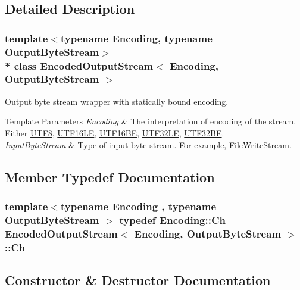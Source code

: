 \subsection{Detailed Description}
\subsubsection*{template$<$typename Encoding, typename Output\+Byte\+Stream$>$\\*
class Encoded\+Output\+Stream$<$ Encoding, Output\+Byte\+Stream $>$}

Output byte stream wrapper with statically bound encoding. 


\begin{DoxyTemplParams}{Template Parameters}
{\em Encoding} & The interpretation of encoding of the stream. Either \hyperlink{structUTF8}{U\+T\+F8}, \hyperlink{structUTF16LE}{U\+T\+F16\+LE}, \hyperlink{structUTF16BE}{U\+T\+F16\+BE}, \hyperlink{structUTF32LE}{U\+T\+F32\+LE}, \hyperlink{structUTF32BE}{U\+T\+F32\+BE}. \\
\hline
{\em Input\+Byte\+Stream} & Type of input byte stream. For example, \hyperlink{classFileWriteStream}{File\+Write\+Stream}. \\
\hline
\end{DoxyTemplParams}


\subsection{Member Typedef Documentation}
\subsubsection[{\texorpdfstring{Ch}{Ch}}]{\setlength{\rightskip}{0pt plus 5cm}template$<$typename Encoding , typename Output\+Byte\+Stream $>$ typedef Encoding\+::\+Ch {\bf Encoded\+Output\+Stream}$<$ Encoding, Output\+Byte\+Stream $>$\+::{\bf Ch}}\hypertarget{classEncodedOutputStream_aa8f494d7ee2808307fbc9cd658c0f760}{}\label{classEncodedOutputStream_aa8f494d7ee2808307fbc9cd658c0f760}


\subsection{Constructor \& Destructor Documentation}
